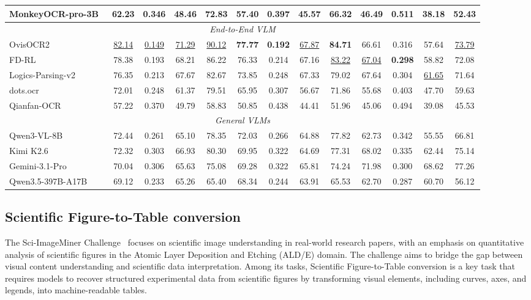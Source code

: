 \documentclass{fairmeta}
\begin{document}
\begin{table}[t]
{\begin{tabular}{lcccccccccccc}
MonkeyOCR-pro-3B~\cite{monkeyocr}
&62.23&0.346&48.46&72.83
&57.40&0.397&45.57&66.32
&46.49&0.511&38.18&52.43
\\

\midrule
\multicolumn{13}{c}{\textit{End-to-End VLM}}
\\
\midrule

OvisOCR2~\cite{lu2026ovisocr2}
&\underline{82.14}&\underline{0.149}&\underline{71.29}&\underline{90.12}
&\textbf{77.77}&\textbf{0.192}&\underline{67.87}&\textbf{84.71}
&66.61&0.316&57.64&\underline{73.79}
\\

FD-RL~\cite{zhong2026reading}
&78.38&0.193&68.21&86.22
&76.33&0.214&67.16&\underline{83.22}
&\underline{67.04}&\textbf{0.298}&58.82&72.08
\\

Logics-Parsing-v2~\cite{LogicsParsing}
&76.35&0.213&67.67&82.67
&73.85&0.248&67.33&79.02
&67.64&0.304&\underline{61.65}&71.64
\\

dots.ocr~\cite{dots_ocr}
&72.01&0.248&61.37&79.51
&65.95&0.307&56.67&71.86
&55.68&0.403&47.70&59.63
\\


Qianfan-OCR~\cite{dong2026qianfan}
&57.22&0.370&49.79&58.83
&50.85&0.438&44.41&51.96
&45.06&0.494&39.08&45.53
\\


\midrule
\multicolumn{13}{c}{\textit{General VLMs}}
\\
\midrule

Qwen3-VL-8B~\cite{yang2025qwen3}
&72.44&0.261&65.10&78.35
&72.03&0.266&64.88&77.82
&62.73&0.342&55.55&66.81
\\

Kimi K2.6
&72.32&0.303&66.93&80.30
&69.95&0.322&64.69&77.31
&68.02&0.335&62.44&75.14
\\

Gemini-3.1-Pro
&70.04&0.306&65.63&75.08
&69.28&0.322&65.81&74.24
&71.98&0.300&68.62&77.26
\\

Qwen3.5-397B-A17B~\cite{team2026qwen3}
&69.12&0.233&65.26&65.40
&68.34&0.244&63.91&65.53
&62.70&0.287&60.70&56.12
\\
\bottomrule
\end{tabular}
}
\label{tab:puredoc}
\end{table}

\subsection{ Scientific Figure-to-Table conversion}
The Sci-ImageMiner Challenge~\cite{ahmed2026icdar} focuses on scientific image understanding in real-world research papers, with an emphasis on quantitative analysis of scientific figures in the Atomic Layer Deposition and Etching (ALD/E) domain. The challenge aims to bridge the gap between visual content understanding and scientific data interpretation. Among its tasks, Scientific Figure-to-Table conversion is a key task that requires models to recover structured experimental data from scientific figures by transforming visual elements, including curves, axes, and legends, into machine-readable tables.
\end{document}
